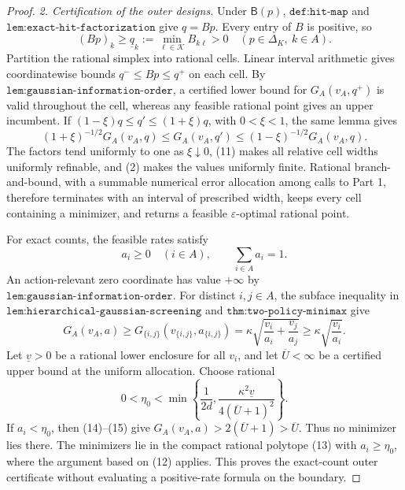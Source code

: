 \documentclass{article}
\begin{document}
\begin{proof}
\emph{2. Certification of the outer designs.}
Under \(\mathsf B(p)\), \(\texttt{def:hit-map}\) and \(\texttt{lem:exact-hit-factorization}\) give \(q=Bp\).  Every entry of \(B\) is positive, so
\[
(Bp)_k\geq\underline q_k:=\min_{\ell\in\mathcal K}B_{k\ell}>0
\quad(p\in\Delta_K,\ k\in A).                                   \tag{11}
\]
Partition the rational simplex into rational cells.  Linear interval arithmetic gives coordinatewise bounds \(q^-\leq Bp\leq q^+\) on each cell.  By \(\texttt{lem:gaussian-information-order}\), a certified lower bound for \(G_A(v_A,q^+)\) is valid throughout the cell, whereas any feasible rational point gives an upper incumbent.  If \((1-\xi)q\leq q'\leq(1+\xi)q\), with \(0<\xi<1\), the same lemma gives
\[
(1+\xi)^{-1/2}G_A(v_A,q)
\leq G_A(v_A,q')
\leq(1-\xi)^{-1/2}G_A(v_A,q).                                    \tag{12}
\]
The factors tend uniformly to one as \(\xi\downarrow0\), (11) makes all relative cell widths uniformly refinable, and (2) makes the values uniformly finite.  Rational branch-and-bound, with a summable numerical error allocation among calls to Part 1, therefore terminates with an interval of prescribed width, keeps every cell containing a minimizer, and returns a feasible \(\varepsilon\)-optimal rational point.

For exact counts, the feasible rates satisfy
\[
a_i\geq0\quad(i\in A),\qquad\sum_{i\in A}a_i=1.                 \tag{13}
\]
An action-relevant zero coordinate has value \(+\infty\) by \(\texttt{lem:gaussian-information-order}\).  For distinct \(i,j\in A\), the subface inequality in \(\texttt{lem:hierarchical-gaussian-screening}\) and \(\texttt{thm:two-policy-minimax}\) give
\[
G_A(v_A,a)\geq G_{\{i,j\}}(v_{\{i,j\}},a_{\{i,j\}})
=\kappa\sqrt{\frac{v_i}{a_i}+\frac{v_j}{a_j}}
\geq\kappa\sqrt{\frac{v_i}{a_i}}.                               \tag{14}
\]
Let \(\underline v>0\) be a rational lower enclosure for all \(v_i\), and let \(\overline U<\infty\) be a certified upper bound at the uniform allocation.  Choose rational
\[
0<\eta_0<\min\left\{\frac1{2d},
\frac{\kappa^2\underline v}{4(\overline U+1)^2}\right\}.         \tag{15}
\]
If \(a_i<\eta_0\), then (14)--(15) give \(G_A(v_A,a)>2(\overline U+1)>\overline U\).  Thus no minimizer lies there.  The minimizers lie in the compact rational polytope (13) with \(a_i\geq\eta_0\), where the argument based on (12) applies.  This proves the exact-count outer certificate without evaluating a positive-rate formula on the boundary.


\end{proof}
\end{document}
